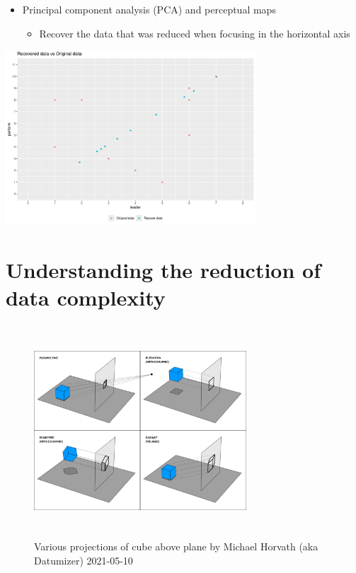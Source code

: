 \documentclass[
  ignorenonframetext,
]{beamer}
\providecommand{\tightlist}{%
  \setlength{\itemsep}{0pt}\setlength{\parskip}{0pt}}\usepackage{longtable,booktabs,array}
\begin{document}
\begin{frame}{}
\label{section-22}
\begin{itemize}
\item
  Principal component analysis (PCA) and perceptual maps

  \begin{itemize}
  \tightlist
  \item
    Recover the data that was reduced when focusing in the horizontal
    axis
  \end{itemize}
\end{itemize}

\begin{center}
\includegraphics[width=0.7\textwidth,height=\textheight]{008_reducing_data_complexity_files/figure-beamer/unnamed-chunk-21-1.pdf}
\end{center}
\end{frame}

\section{Understanding the reduction of data
complexity}\label{understanding-the-reduction-of-data-complexity}

\begin{frame}{}
\label{section-23}
\begin{figure}[H]

{\centering \includegraphics[width=3.125in,height=3.125in]{../000_images/008_various_projections_of_cube_above_plane.png}

}

\caption{Various projections of cube above plane by Michael Horvath (aka
Datumizer) 2021-05-10}

\end{figure}%
\end{frame}
\end{document}

